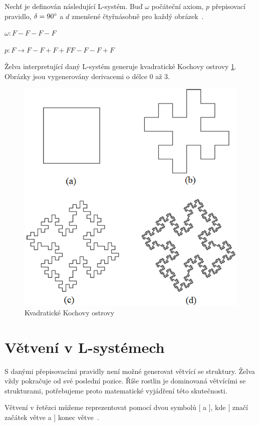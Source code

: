 \documentclass[thesis=M,czech]{FITthesis}[2019/12/23]
\begin{document}
Nechť je definován následující L-systém. Buď $\omega$ počáteční axiom, $p$ pře\-pi\-so\-va\-cí pravidlo, $\delta = 90\degree$ a $d$ zmenšené čtyřnásobně pro každý obrázek~\cite{abop7}.

\bigskip
$\omega: F-F-F-F$

\medskip
$p: F \rightarrow F-F+F+FF-F-F+F$

\bigskip
Želva interpretující daný L-systém generuje kvadratické Kochovy ostrovy \ref{fig:koch_island}. Obrázky jsou vygenerovány derivacemi o délce 0 až 3.

\begin{figure}\centering
	\includegraphics[width=\textwidth]{images/koch_island}
	\caption[Kvadratické Kochovy ostrovy]{Kvadratické Kochovy ostrovy}\label{fig:koch_island}
\end{figure}

\section{Větvení v L-systémech}
S danými přepisovacími pravidly není možné generovat větvící se struktury. Želva vždy pokračuje od své poslední pozice. Říše rostlin je dominovaná vět\-ví\-cí\-mi se strukturami, potřebujeme proto matematické vyjádření této skutečnosti.

Větvení v řetězci můžeme reprezentovat pomocí dvou symbolů [ a ], kde [ značí začátek větve a ] konec větve~\cite{abop24}.
\end{document}
